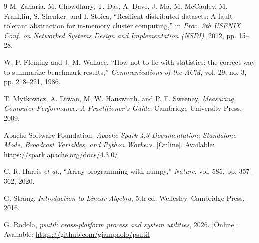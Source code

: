 \documentclass[11pt,a4paper]{article}
\begin{document}
{\small
\begin{thebibliography}{9}
M. Zaharia, M. Chowdhury, T. Das, A. Dave, J. Ma, M. McCauley,
M. Franklin, S. Shenker, and I. Stoica, ``Resilient distributed datasets:
A fault-tolerant abstraction for in-memory cluster computing,'' in
\emph{Proc. 9th USENIX Conf. on Networked Systems Design and
Implementation (NSDI)}, 2012, pp. 15--28.

W. P. Fleming and J. M. Wallace, ``How not to lie with statistics: the
correct way to summarize benchmark results,'' \emph{Communications of
the ACM}, vol. 29, no. 3, pp. 218--221, 1986.

T. Mytkowicz, A. Diwan, M. W. Hauswirth, and P. F. Sweeney,
\emph{Measuring Computer Performance: A Practitioner's Guide}.
Cambridge University Press, 2009.

Apache Software Foundation, \emph{Apache Spark 4.3 Documentation:
Standalone Mode, Broadcast Variables, and Python Workers}. [Online].
Available: \url{https://spark.apache.org/docs/4.3.0/}

C. R. Harris \emph{et al.}, ``Array programming with numpy,''
\emph{Nature}, vol. 585, pp. 357--362, 2020.

G. Strang, \emph{Introduction to Linear Algebra}, 5th ed.
Wellesley--Cambridge Press, 2016.

G. Rodola, \emph{psutil: cross-platform process and system utilities},
2026. [Online]. Available: \url{https://github.com/giampaolo/psutil}
\end{thebibliography}}
\end{document}
